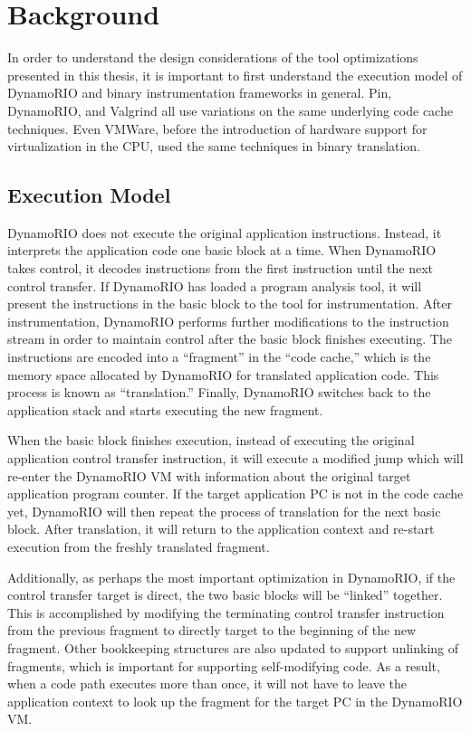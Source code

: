 \chapter{Background}


In order to understand the design considerations of the tool optimizations
presented in this thesis, it is important to first understand the execution
model of DynamoRIO and binary instrumentation frameworks in general.
Pin\cite{pin}, DynamoRIO, and Valgrind\cite{valgrind} all use variations on the
same underlying code cache techniques.  Even VMWare, before the introduction of
hardware support for virtualization in the CPU, used the same techniques in
binary translation.\cite{vmware_comparison}

\section{Execution Model}

DynamoRIO does not execute the original application instructions.  Instead, it
interprets the application code one basic block at a time.  When DynamoRIO takes
control, it decodes instructions from the first instruction until the next
control transfer.  If DynamoRIO has loaded a program analysis tool, it will
present the instructions in the basic block to the tool for instrumentation.
After instrumentation, DynamoRIO performs further modifications to the
instruction stream in order to maintain control after the basic block finishes
executing.  The instructions are encoded into a ``fragment'' in the ``code
cache,'' which is the memory space allocated by DynamoRIO for translated
application code.  This process is known as ``translation.''  Finally, DynamoRIO
switches back to the application stack and starts executing the new fragment.

When the basic block finishes execution, instead of executing the original
application control transfer instruction, it will execute a modified jump which
will re-enter the DynamoRIO VM with information about the original target
application program counter.  If the target application PC is not in the code
cache yet, DynamoRIO will then repeat the process of translation for the next
basic block.  After translation, it will return to the application context and
re-start execution from the freshly translated fragment.

Additionally, as perhaps the most important optimization in DynamoRIO, if the
control transfer target is direct, the two basic blocks will be ``linked''
together.  This is accomplished by modifying the terminating control transfer
instruction from the previous fragment to directly target to the beginning of
the new fragment.  Other bookkeeping structures are also updated to support
unlinking of fragments, which is important for supporting self-modifying code.
As a result, when a code path executes more than once, it will not have to leave
the application context to look up the fragment for the target PC in the
DynamoRIO VM.

